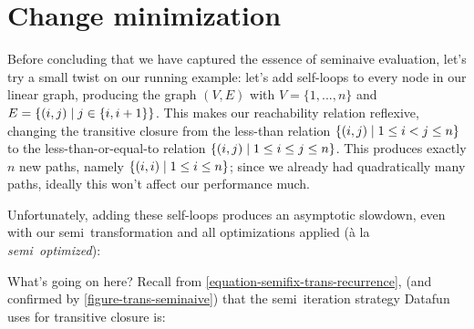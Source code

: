 \section{Change minimization}

\label{section-change-minimization}

Before concluding that we have captured the essence of seminaive evaluation, let's try a small twist on our running example: let's add self-loops to every node in our linear graph, producing the graph $(V,E)$ with $V = \{1, ..., n\}$ and $E = \{(i,j) \mathrel{|} j \in \{i,i+1\}\}$.
%
This makes our reachability relation reflexive, changing the transitive closure from the less-than relation $\{(i,j) \mathrel{|} 1 \le i < j \le n\}$ to the less-than-or-equal-to relation $\{(i,j) \mathrel{|} 1 \le i \le j \le n\}$.
%
This produces exactly $n$ new paths, namely $\{(i,i) \mathrel{|} 1 \le i \le n\}$; since we already had quadratically many paths, ideally this won't affect our performance much.

Unfortunately, adding these self-loops produces an asymptotic slowdown, even with our semi\naive\ transformation and all optimizations applied (\`a la \emph{semi\naive\ optimized}):

\nopagebreak[3]
\begin{center}
  \small\sffamily
\end{center}

\noindent
What's going on here?
%
Recall from \cref{equation-semifix-trans-recurrence},  (and confirmed by \cref{figure-trans-seminaive}) that the semi\naive\ iteration strategy Datafun uses for transitive closure is:

